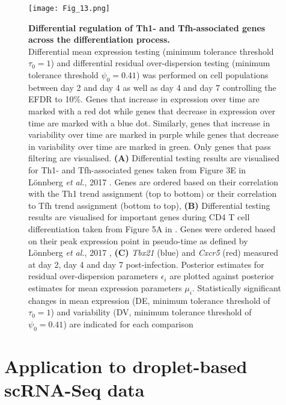 \newpage

\begin{figure}[!h]
  \begin{minipage}[c]{0.57\textwidth}
    \texttt{[image: Fig\_13.png]}
  \end{minipage}\hfill
  \begin{minipage}[c]{0.4\textwidth}
\caption[Differential regulation of lineage-associated genes across differentiation]{\textbf{Differential regulation of Th1- and Tfh-associated genes across the differentiation process.}\\
Differential mean expression testing (minimum tolerance threshold $\tau_0=1$) and differential residual over-dispersion testing (minimum tolerance threshold $\psi_0=0.41$) was performed on cell populations between day 2 and day 4 as well as day 4 and day 7 controlling the EFDR to 10\%. 
Genes that increase in expression over time are marked with a red dot while genes that decrease in expression over time are marked with a blue dot. 
Similarly, genes that increase in variability over time are marked in purple while genes that decrease in variability over time are marked in green. Only genes that pass filtering are visualised. 
\textbf{(A)} Differential testing results are visualised for Th1- and Tfh-associated genes taken from Figure 3E in L\"onnberg \emph{et al.}, 2017 \citep{Lonnberg2017}. 
Genes are ordered based on their correlation with the Th1 trend assignment (top to bottom) or their correlation to Tfh trend assignment (bottom to top), 
\textbf{(B)} Differential testing results are visualised for important genes during CD4\plus{} T cell differentiation taken from Figure 5A in \citep{Lonnberg2017}. Genes were ordered based on their peak expression point in pseudo-time as defined by L\"onnberg \emph{et al.}, 2017 \citep{Lonnberg2017}, 
\textbf{(C)} \textit{Tbx21} (blue) and \textit{Cxcr5} (red) measured at day 2, day 4 and day 7 post-infection. 
Posterior estimates for residual over-dispersion parameters $\epsilon_i$ are plotted against posterior estimates for mean expression parameters $\mu_i$. 
Statistically significant changes in mean expression (DE, minimum tolerance threshold of $\tau_0=1$) and variability (DV, minimum tolerance threshold of $\psi_0=0.41$) are indicated for each comparison} \label{fig2:immune_differentiation2}
  \end{minipage}
\end{figure}

\newpage

\section{Application to droplet-based scRNA-Seq data}
\label{sec2:droplet}

